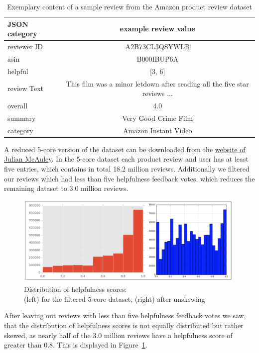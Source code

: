 \documentclass[a4paper,11pt]{article}
\begin{document}
\begin{table}[h!]
\centering
 \begin{tabular}{l |c}
 JSON category & example review value \\ \hline
 reviewer ID & A2B73CL3QSYWLB \\ 
 asin & B000IBUP6A \\ 
 helpful & [3, 6] \\ 
review Text & This film was a minor letdown after reading all the five star reviews ... \\ 
 overall & 4.0 \\ 
 summary & Very Good Crime Film \\ 
 category & Amazon Instant Video
 \end{tabular}
 \captionsetup{justification=centering,margin=2cm}
 \caption{ Exemplary content of a sample review from the Amazon product review dataset}
 \label{tab:JSON}
\end{table}

A reduced 5-core version of the dataset can be downloaded from the \href{http://jmcauley.ucsd.edu/data/amazon/links.html}{website of Julian McAuley}. In the 5-core dataset each product review and user has at least five entries, which contains in total 18.2 million reviews. Additionally we filtered our reviews which had less than five helpfulness feedback votes, which reduces the remaining dataset to 3.0 million reviews.

\begin{figure}[h!]
\centering
\includegraphics[width=0.7\linewidth]{pics/data_distribution.png}
\captionsetup{justification=centering,margin=2cm}
\caption{Distribution of helpfulness scores: \\ (left) for the filtered 5-core dataset, (right) after unskewing}
\label{pic:distri}
\end{figure}

After leaving out reviews with less than five helpfulness feedback votes we saw, that the distribution of helpfulness scores is not equally distributed but rather skewed, as nearly half of the 3.0 million reviews have a helpfulness score of greater than 0.8. This is displayed in Figure~\ref{pic:distri}. 
\end{document}
